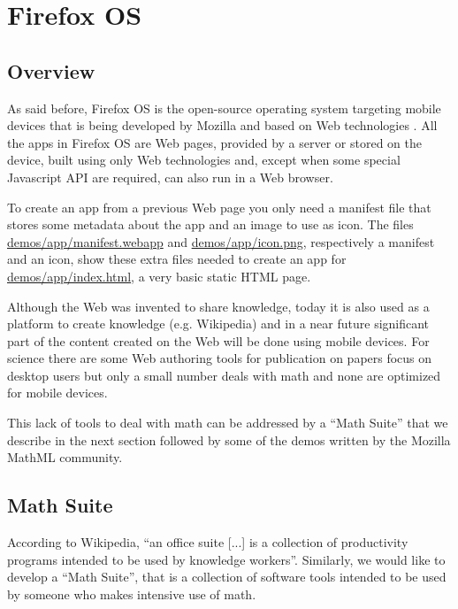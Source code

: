 \section{Firefox OS}
\label{sec:firefoxOS}

\subsection{Overview}

As said before,
Firefox OS is the open-source operating system targeting mobile devices that
is being
developed by Mozilla and based on Web technologies \cite{MozillaFirefoxOS}.
All the apps in Firefox OS
are Web pages, provided by a server or stored on the device, built using only Web
technologies and, except when
some special Javascript API are required, can also run in a Web browser.

To create an app from a previous Web page you only need a manifest
file that stores some metadata about the app and an image to use as icon. The
files
\href{http://fred-wang.github.io/MathUI2014/demos/app/manifest.webapp}{demos/app/manifest.webapp}
and
\href{http://fred-wang.github.io/MathUI2014/demos/app/icon.png}{demos/app/icon.png},
respectively a manifest and an icon,
show these extra files needed to create an app for
\href{http://fred-wang.github.io/MathUI2014/demos/app/index.html}{demos/app/index.html},
a very basic static HTML page.

Although the Web was invented to share knowledge, today it is also used
as a platform to create knowledge (e.g. Wikipedia) and in a near future
significant part of the content created on the Web will be done using mobile
devices. For science there are some Web authoring tools for publication on
papers focus on desktop users but only a small number deals with math and none
are optimized for mobile devices.

This lack of tools to deal with math can be addressed by a ``Math Suite'' that
we describe in the next section followed by some of the demos written by the
Mozilla MathML community.

\subsection{Math Suite}
\label{sec:mathsuite}

According to Wikipedia, ``an office suite [...] is a collection of productivity
programs intended to be used by knowledge workers''. Similarly, we would like
to develop a ``Math Suite'', that is a collection of software tools
intended to be used by someone who makes intensive use of math.

